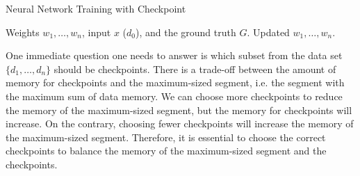 \begin{algorithm}[h!tb]
\begin{algorithmic}
\caption{Neural Network Training with Checkpoint}
\label{alg:train-checkpoint}
\Require Weights $w_1, \ldots, w_n$, input $x$ ($d_0$), and the ground truth $G$.
\Ensure Updated $w_1, \ldots, w_n$.\\
                 
        \EndIf
\EndFor
{}     
    \EndIf
     
\EndFor 
\end{algorithmic}
\end{algorithm}

One immediate question one needs to answer is which subset from the data set $\{d_1, \ldots, d_n\}$ should be checkpoints.
There is a trade-off between the amount of memory for checkpoints and the maximum-sized segment, i.e. the segment with the maximum sum of data memory.
We can choose more checkpoints to reduce the memory of the maximum-sized segment, but the memory for checkpoints will increase.
On the contrary, choosing fewer checkpoints will increase the memory of the maximum-sized segment.
Therefore, it is essential to choose the correct checkpoints to balance the memory of the maximum-sized segment and the checkpoints.
